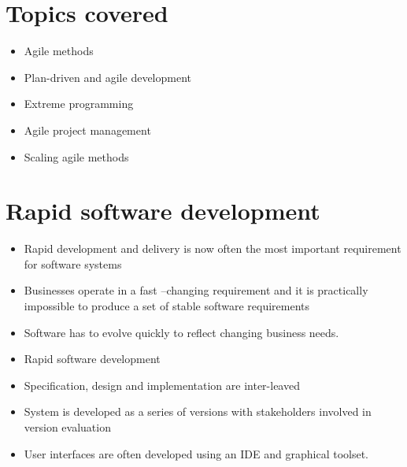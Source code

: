 \section{ Topics covered}
\begin{itemize}

\item Agile methods

\item Plan-driven and agile development

\item Extreme programming

\item Agile project management

\item Scaling agile methods

\end{itemize}
\section{ Rapid software development}
\begin{itemize}

\item Rapid development and delivery is now often the most important requirement for software systems

\item Businesses operate in a fast –changing requirement and it is practically impossible to produce a set of stable software requirements
\item Software has to evolve quickly to reflect changing business needs.
\item Rapid software development
\item Specification, design and implementation are inter-leaved

\item System is developed as a series of versions with stakeholders involved in version evaluation
\item User interfaces are often developed using an IDE and graphical toolset.

\end{itemize}
